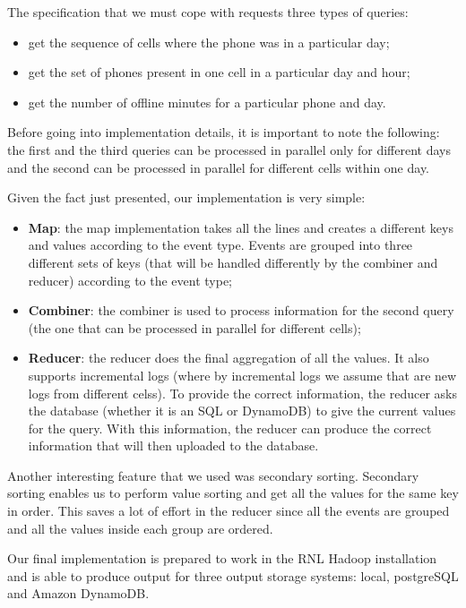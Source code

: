 \documentclass{article}
\begin{document}
The specification that we must cope with requests three types of queries: 

\begin{itemize}
\item get the sequence of cells where the phone was in a particular day;
\item get the set of phones present in one cell in a particular day and hour;
\item get the number of offline minutes for a particular phone and day.
\end{itemize}

Before going into implementation details, it is important to note the following: the first and the third queries can be processed in parallel only for different days and the second can be processed in parallel for different cells within one day.

Given the fact just presented, our implementation is very simple:

\begin{itemize}
\item \textbf{Map}: the map implementation takes all the lines and creates a different keys and values according to the event type. Events are grouped into three different sets of keys (that will be handled differently by the combiner and reducer) according to the event type;
\item \textbf{Combiner}: the combiner is used to process information for the second query (the one that can be processed in parallel for different cells);
\item \textbf{Reducer}: the reducer does the final aggregation of all the values. It also supports incremental logs (where by incremental logs we assume that are new logs from different celss). To provide the correct information, the reducer asks the database (whether it is an SQL or DynamoDB) to give the current values for the query. With this information, the reducer can produce the correct information that will then uploaded to the database. 
\end{itemize}

Another interesting feature that we used was secondary sorting. Secondary sorting enables us to perform value sorting and get all the values for the same key in order. This saves a lot of effort in the reducer since all the events are grouped and all the values inside each group are ordered.

Our final implementation is prepared to work in the RNL Hadoop installation and is able to produce output for three output storage systems: local, postgreSQL and Amazon DynamoDB. 
\end{document}
